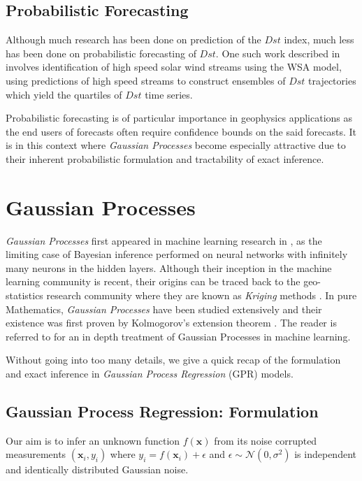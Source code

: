 \documentclass{article}
\begin{document}
\subsection{Probabilistic Forecasting}
Although much research has been done on prediction of the $Dst$ index, much less has been done on probabilistic forecasting of $Dst$. One such work described in \citet{McPherron:2013} involves identification of high speed solar wind streams using the WSA model, using predictions of high speed streams to construct ensembles of $Dst$ trajectories which yield the quartiles of $Dst$ time series. 

Probabilistic forecasting is of particular importance in geophysics applications as the end users of forecasts often require confidence bounds on the said forecasts. It is in this context where \emph{Gaussian Processes} become especially attractive due to their inherent probabilistic formulation and tractability of exact inference.


\section{Gaussian Processes}

\emph{Gaussian Processes} first appeared in machine learning research in \citet{Neal:1996:BLN:525544}, as the limiting case of Bayesian inference performed on neural networks with infinitely many neurons in the hidden layers. Although their inception in the machine learning community is recent, their origins can be traced back to the geo-statistics research community where they are known as \emph{Kriging} methods \citep{krige1951statistical}. In pure Mathematics, \emph{Gaussian Processes} have been studied extensively and their existence was first proven by Kolmogorov's extension theorem \citep{tao2011introduction}. The reader is referred to \citet{Rasmussen:2005:GPM:1162254} for an in depth treatment of Gaussian Processes in machine learning.

Without going into too many details, we give a quick recap of the formulation and exact inference in \emph{Gaussian Process Regression} (GPR) models. 

\subsection{Gaussian Process Regression: Formulation}

Our aim is to infer an unknown function $f(\mathbf{x})$ from its noise corrupted measurements $(\mathbf{x}_i, y_i)$ where $y_i = f(\mathbf{x}_i) + \epsilon$ and $\epsilon \sim \mathcal{N}(0, \sigma^2)$ is independent and identically distributed Gaussian noise.
\end{document}
